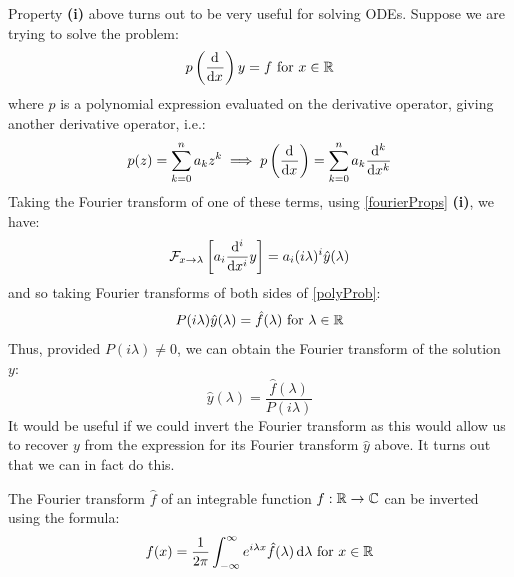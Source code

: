 \documentclass[../main.tex]{subfiles}
\begin{document}
Property \textbf{(i)} above turns out to be very useful for solving ODEs.
Suppose we are trying to solve the problem:
\begin{equation}
  p\left(\deriv{}{x}\right)y = f \text{ for } x \in \R \label{polyProb}
\end{equation}
where $p$ is a polynomial expression evaluated on the derivative operator, giving another derivative operator, i.e.:
\[
  p(z) = \sum_{k = 0}^{n} a_k z^k \implies p\left(\deriv{}{x}\right) = \sum_{k = 0}^{n} a_k \deriv[k]{}{x}
\]
Taking the Fourier transform of one of these terms, using \cref{fourierProps} \textbf{(i)}, we have:
\[
  \mathcal{F}_{x \to \lambda}\left[a_i \deriv[i]{}{x} y\right] = a_i(i\lambda)^i \hat{y}(\lambda)
\]
and so taking Fourier transforms of both sides of \cref{polyProb}:
\[
  P(i \lambda) \hat{y}(\lambda) = \hat{f}(\lambda) \text{ for } \lambda \in \mathbb{R}
\]
Thus, provided $P(i \lambda) \neq 0$, we can obtain the Fourier transform of the solution $y$:
\begin{equation}
  \hat{y}(\lambda) = \frac{\hat{f}(\lambda)}{P(i\lambda)} \label{fourierPoly}
\end{equation}
It would be useful if we could invert the Fourier transform as this would allow us to recover $y$ from the expression for its Fourier transform $\hat{y}$ above.
It turns out that we can in fact do this.
\begin{proposition}
  The Fourier transform $\hat{f}$ of an integrable function $f: \mathbb{R} \to \mathbb{C}$ can be inverted using the formula: \label{fourierInverse}
  \[
    f(x) = \frac{1}{2\pi} \int_{-\infty}^{\infty} e^{i \lambda x} \hat{f}(\lambda) \d{\lambda} \text{ for } x \in \R
  \]
\end{proposition}
\end{document}
